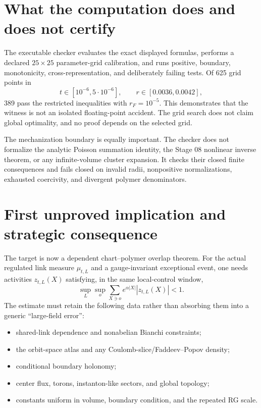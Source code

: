\documentclass[11pt]{article}
\theoremstyle{definition}
\begin{document}
\section{What the computation does and does not certify}

The executable checker evaluates the exact displayed formulas, performs a
declared $25\times25$ parameter-grid calibration, and runs positive,
boundary, monotonicity, cross-representation, and deliberately failing tests.
Of 625 grid points in
\[
 t\in[10^{-6},5\cdot10^{-6}],\qquad
 r\in[0.0036,0.0042],
\]
389 pass the restricted inequalities with $r_F=10^{-5}$.  This demonstrates
that the witness is not an isolated floating-point accident.  The grid search
does not claim global optimality, and no proof depends on the selected grid.

The mechanization boundary is equally important.  The checker does not
formalize the analytic Poisson summation identity, the Stage 08 nonlinear
inverse theorem, or any infinite-volume cluster expansion.  It checks their
closed finite consequences and fails closed on invalid radii, nonpositive
normalizations, exhausted coercivity, and divergent polymer denominators.

\section{First unproved implication and strategic consequence}

The target is now a dependent chart--polymer overlap theorem.  For the actual
regulated link measure $\mu_{t,L}$ and a gauge-invariant exceptional event,
one needs activities $z_{t,L}(X)$ satisfying, in the same local-control
window,
\begin{equation}\label{eq:target}
 \sup_L\sup_{o}\sum_{X\ni o}
 e^{\alpha|X|}|z_{t,L}(X)|<1.
\end{equation}
The estimate must retain the following data rather than absorbing them into a
generic ``large-field error'':
\begin{itemize}
\item shared-link dependence and nonabelian Bianchi constraints;
\item the orbit-space atlas and any Coulomb-slice/Faddeev--Popov density;
\item conditional boundary holonomy;
\item center flux, torons, instanton-like sectors, and global topology;
\item constants uniform in volume, boundary condition, and the repeated RG
  scale.
\end{itemize}
\end{document}
